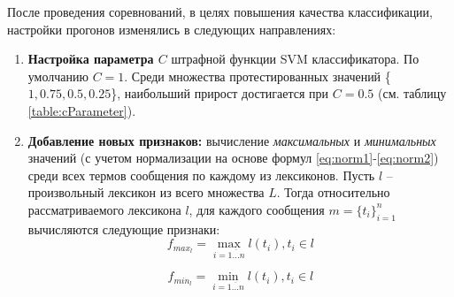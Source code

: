 После проведения соревнований, в целях повышения качества классификации,
настройки прогонов изменялись в следующих направлениях:
\begin{enumerate}
    \item {\bf Настройка параметра $C$} штрафной функции SVM классификатора.
        По умолчанию $C=1$.
        Среди множества протестированных значений \{$1, 0.75, 0.5, 0.25$\},
        наибольший прирост достигается при {\bf $C = 0.5$} (см. таблицу \ref{table:cParameter}).
    \item {\bf Добавление новых признаков:} вычисление {\it максимальных} и
        {\it минимальных} значений (с учетом нормализации на основе формул
        \ref{eq:norm1}-\ref{eq:norm2}) среди всех термов сообщения по каждому
        из лексиконов.
        Пусть $l$ -- произвольный лексикон из всего множества $L$.
        Тогда относительно рассматриваемого лексикона $l$, для каждого сообщения
        $m = \{t_i\}_{i=1}^n$ вычисляются следующие признаки:
        \begin{equation}
            f_{max_l} = \max_{i=\overline{1 \ldots n}}l(t_i), t_i \in l \nonumber
        \end{equation}

        \begin{equation}
            f_{min_l} = \min\limits_{i=\overline{1 \ldots n}}l(t_i), t_i \in l \nonumber
        \end{equation}
\end{enumerate}

